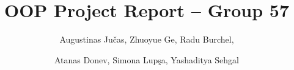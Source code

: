 \documentclass[sigconf]{acmart}
\title{OOP Project Report -- Group 57}
\author{Augustinas Jučas, Zhuoyue Ge, Radu Burchel,}
\author{Atanas Donev, Simona Lupşa,  Yashaditya Sehgal}
\begin{document}
\begin{abstract}

\end{abstract}

\maketitle









\end{document}
